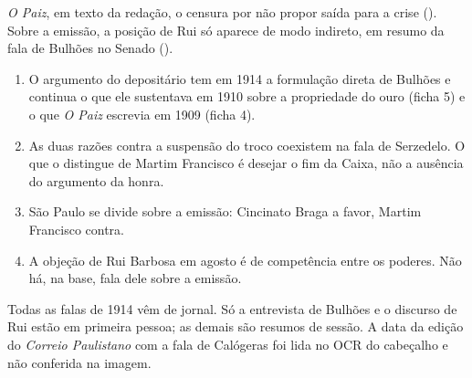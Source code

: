 \textit{O Paiz}, em texto da redação, o censura por não propor saída para a
crise (). Sobre a emissão, a posição
de Rui só aparece de modo indireto, em resumo da fala de Bulhões no Senado
().


\begin{enumerate}[leftmargin=*,nosep]
\item O argumento do depositário tem em 1914 a formulação direta de Bulhões e
continua o que ele sustentava em 1910 sobre a propriedade do ouro (ficha 5) e
o que \textit{O Paiz} escrevia em 1909 (ficha 4).
\item As duas razões contra a suspensão do troco coexistem na fala de
Serzedelo. O que o distingue de Martim Francisco é desejar o fim da Caixa, não
a ausência do argumento da honra.
\item São Paulo se divide sobre a emissão: Cincinato Braga a favor, Martim
Francisco contra.
\item A objeção de Rui Barbosa em agosto é de competência entre os poderes.
Não há, na base, fala dele sobre a emissão.
\end{enumerate}


Todas as falas de 1914 vêm de jornal. Só a entrevista de Bulhões e o discurso
de Rui estão em primeira pessoa; as demais são resumos de sessão. A data da
edição do \textit{Correio Paulistano} com a fala de Calógeras foi lida no OCR
do cabeçalho e não conferida na imagem.
